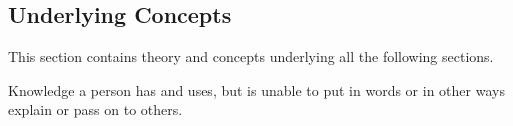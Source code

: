 \subsection{Underlying Concepts}
\label{sec:1_concepts}
This section contains theory and concepts underlying all the following sections.

\begin{definition} \label{def:tatic_knowledge} 
  Knowledge a person has and uses, but is unable to put in words or in other ways explain or pass on to others.
\end{definition}
